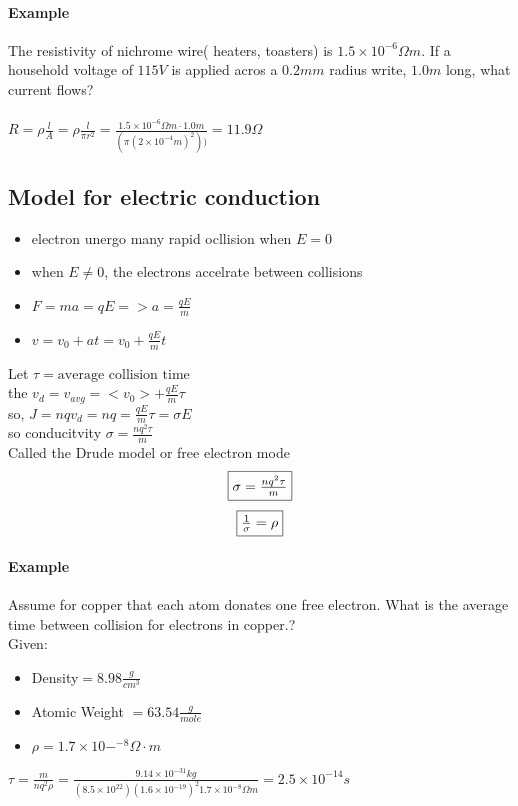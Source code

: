 \documentclass{article}
\begin{document}
    \paragraph{Example} The resistivity of nichrome wire( heaters, toasters) is $1.5 \times 10^{-6}\Omega m$. 
    If a household voltage of $115V$ is applied acros a $0.2mm$ radius write, $1.0m$ long, what current flows?
    \paragraph{}$R = \rho \frac{l}{A} = \rho \frac{l}{\pi r^2} = \frac{1.5 \times 10^{-6}\Omega m \cdot 1.0 m}{(\pi (2\times 10^{-4}m)^2))} = 11.9 \Omega$    
   
    \subsection{Model for electric conduction}
    \begin{itemize}
        \item electron unergo many rapid ocllision when  $E = 0$
        \item when $E \neq 0$, the electrons accelrate between collisions
        \item $F = ma = qE => a = \frac{qE}{m}$
        \item $v = v_0 + at= v_0 + \frac{qE}{m}t $
    \end{itemize}
    Let $\tau = \text{average collision time}$\\
    the  $v_d = v_{avg} = <v_0> + \frac{qE}{m}\tau$\\
    so, $J = nqv_d = nq = \frac{qE}{m}\tau = \sigma E$\\
    so conducitvity $\sigma = \frac{nq^2\tau}{m}$\\
    Called the Drude model or free electron mode\\
    $$\boxed{$$\sigma = \frac{nq^2 \tau}{m}$$}$$
    $$\boxed{$$\frac{1}{\sigma} = \rho$$}$$
    \paragraph{Example} Assume for copper that each atom donates one free electron. What is the average time between collision for electrons in copper.?
    \\Given: 
    \begin{itemize}
        \item Density$ = 8.98\frac{g}{cm^3}$
        \item Atomic Weight $ = 63.54\frac{g}{mole}$
        \item $\rho = 1.7 \times 10-^{-8}\Omega\cdot m$
    \end{itemize}
    $\tau = \frac{m}{nq^2\rho}=\frac{9.14 \times 10^{-31}kg}{(8.5\times10^22 ) (1.6\times10^{-19})^2 1.7\times10^{-8}\Omega m} = 2.5\times10^{-14}s$
\end{document}
